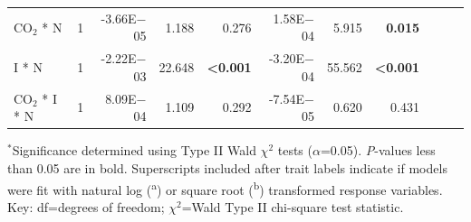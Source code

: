 \begin{landscape}
\begin{table}
{\begin{tabular}{p{3cm}p{0.5cm}p{1.75cm}p{1.5cm}p{1.5cm}p{1.75cm}p{1.5cm}p{1.5cm}p{1.75cm}p{1.5cm}p{1.5cm}}
            CO$_2$ * N & \multicolumn{1}{r}{1}
            & \multicolumn{1}{r}{-3.66E$-$05}   & \multicolumn{1}{r}{1.188}         & \multicolumn{1}{r}{0.276}
            & \multicolumn{1}{r}{1.58E$-$04}    & \multicolumn{1}{r}{5.915}         & \multicolumn{1}{r}{\textbf{0.015}}
            &&&
            \\

            I * N & \multicolumn{1}{r}{1}
            & \multicolumn{1}{r}{-2.22E$-$03}   & \multicolumn{1}{r}{22.648}        & \multicolumn{1}{r}{\textbf{<0.001}}
            & \multicolumn{1}{r}{-3.20E$-$04}   & \multicolumn{1}{r}{55.562}        & \multicolumn{1}{r}{\textbf{<0.001}}
            &&&
            \\

            CO$_2$ * I * N & \multicolumn{1}{r}{1}
            & \multicolumn{1}{r}{8.09E$-$04}    & \multicolumn{1}{r}{1.109}         & \multicolumn{1}{r}{0.292}
            & \multicolumn{1}{r}{-7.54E$-$05}   & \multicolumn{1}{r}{0.620}         & \multicolumn{1}{r}{0.431}
            &&&
            \\
            \hline
    \end{tabular}}
    \label{tab:table5.4}
    \end{table}
    \begin{singlespace}
        \noindent $^*$Significance determined using Type II Wald $\chi^2$ tests ($\alpha$=0.05). \textit{P}-values less than 0.05 are in bold. Superscripts included after trait labels indicate if models were fit with natural log (\textsuperscript{a}) or square root (\textsuperscript{b}) transformed response variables. Key: df=degrees of freedom; $\chi^2$=Wald Type II chi-square test statistic.
    \end{singlespace}
\end{landscape}
\clearpage


